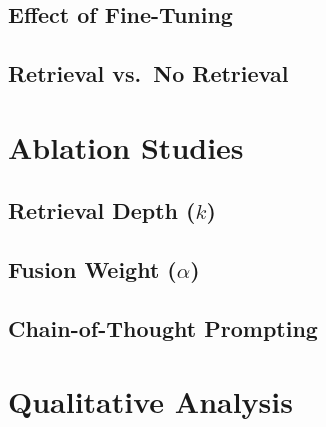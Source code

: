 \documentclass[conference]{IEEEtran}
\begin{document}

\subsection{Effect of Fine-Tuning}


\subsection{Retrieval vs.\ No Retrieval}


\section{Ablation Studies}
\label{sec:ablations}

\subsection{Retrieval Depth ($k$)}


\subsection{Fusion Weight ($\alpha$)}


\subsection{Chain-of-Thought Prompting}


\section{Qualitative Analysis}
\label{sec:qualitative}

\end{document}
